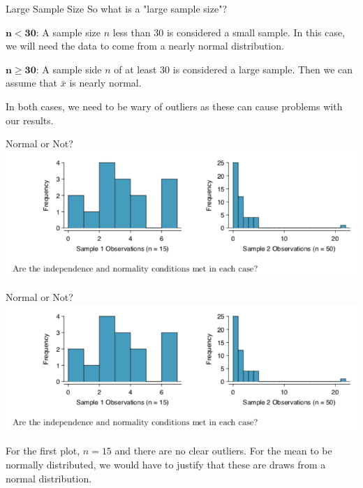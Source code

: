 \begin{frame}{Large Sample Size}
    So what is a "large sample size"? 
    
    \vspace{12pt}$\boldsymbol{n < 30}$: A sample size $n$ less than 30 is considered a small sample. In this case, we will need the data to come from a nearly normal distribution.
    
    \vspace{12pt}$\boldsymbol{n \ge 30}$: A sample side $n$ of at least 30 is considered a large sample. Then we can assume that $\bar{x}$ is nearly normal.
    
    \vspace{12pt}In both cases, we need to be wary of outliers as these can cause problems with our results.
\end{frame}

\begin{frame}{Normal or Not?}
    \includegraphics[scale=0.45]{images/normalorno.png}
\end{frame}

\begin{frame}{Normal or Not?}
    \includegraphics[scale=0.4]{images/normalorno.png}
    
    For the first plot, $n=15$ and there are no clear outliers. For the mean to be normally distributed, we would have to justify that these are draws from a normal distribution. 
\end{frame}

